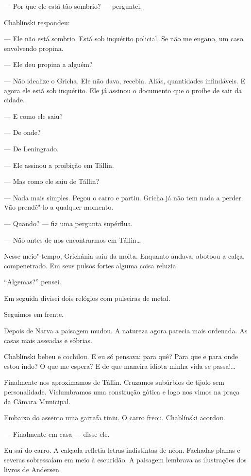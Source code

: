 --- Por que ele está tão sombrio? --- perguntei.

Chablínski respondeu:

--- Ele não está sombrio. Está sob inquérito policial. Se não me engano,
um caso envolvendo propina.

--- Ele deu propina a alguém?

--- Não idealize o Gricha. Ele não dava, recebia. Aliás, quantidades
infindáveis. E agora ele está sob inquérito. Ele já assinou o documento
que o proíbe de sair da cidade.

--- E como ele saiu?

--- De onde?

--- De Leningrado.

--- Ele assinou a proibição em Tállin.

--- Mas como ele saiu de Tállin?

--- Nada mais simples. Pegou o carro e partiu. Gricha já não tem nada a
perder. Vão prendê"-lo a qualquer momento.

--- Quando? --- fiz uma pergunta supérflua.

--- Não antes de nos encontrarmos em Tállin\ldots{}

Nesse meio"-tempo, Grichánia saiu da moita. Enquanto andava, abotoou a
calça, compenetrado. Em seus pulsos fortes alguma coisa reluzia.

``Algemas?'' pensei.

Em seguida divisei dois relógios com pulseiras de metal.

Seguimos em frente.

Depois de Narva a paisagem mudou. A natureza agora parecia mais
ordenada. As casas mais asseadas e sóbrias.

Chablínski bebeu e cochilou. E eu só pensava: para quê? Para que e para
onde estou indo? O que me espera? E de que maneira idiota minha vida se
passa!\ldots{}

Finalmente nos aproximamos de Tállin. Cruzamos subúrbios de tijolo sem
personalidade. Vislumbramos uma construção gótica e logo nos vimos na
praça da Câmara Municipal.

Embaixo do assento uma garrafa tiniu. O carro freou. Chablínski acordou.

--- Finalmente em casa --- disse ele.

Eu saí do carro. A calçada refletia letras indistintas de néon. Fachadas
planas e severas sobressaíam em meio à escuridão. A paisagem lembrava as
ilustrações dos livros de Andersen.

